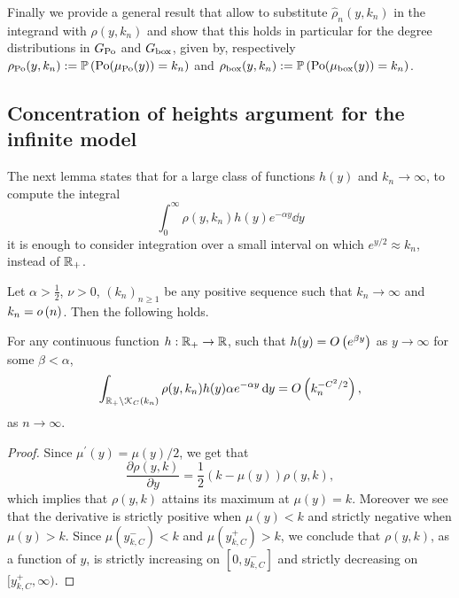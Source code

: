 \begin{appendices}
Finally we provide a general result that allow to substitute $\hat{\rho}_n(y,k_n)$ in the integrand with $\rho(y,k_n)$ and show that this holds in particular for the degree distributions in $G_{{\mathrm{Po}}}$ and $G_{\mathrm{box}}$, given by, respectively $\rho_{{\mathrm{Po}}}(y,k_n) := \mathbb{P}\left({\mathrm{Po}}(\mu_{{\mathrm{Po}}}(y)) = k_n\right)$ and $\rho_{\text{box}}(y,k_n) := \mathbb{P}\left({\mathrm{Po}}(\mu_{\mathrm{box}}(y)) = k_n\right)$.

\subsection{Concentration of heights argument for the infinite model}

The next lemma states that for a large class of functions $h(y)$ and $k_n \to \infty$, to compute the integral 
\[
	\int_{0}^\infty \rho(y,k_n) h(y) e^{-\alpha y} \dd y
\]
it is enough to consider integration over a small interval on which $e^{y/2} \approx k_n$, instead of ${\mathbb R}_+$. 

\begin{lemma}\label{lem:concentration_argument}
Let $\alpha > \frac{1}{2}$, $\nu > 0$, $(k_n)_{n \ge 1}$ be any positive sequence such that $k_n \to \infty$ and $k_n = o\left(n\right)$. Then the following holds.

For any continuous function $h : {\mathbb R}_+ \rightarrow  {\ensuremath{\mathbb R}}$, such that $h(y) = O\left(e^{\beta y}\right)$ as $y \to \infty$ for some $\beta < \alpha$, 
\begin{equation}\label{eq:error_bound_int_rho_not_K}
	\int_{{\mathbb R}_+ \setminus {\mathcal K}_C(k_n)} \rho(y,k_n) h(y) \alpha e^{-\alpha y} \operatorname{\mathrm{d}\hspace{-2pt}} y
	= O\left(k_n^{-C^2/2}\right),
\end{equation}
as $n \to \infty$.
\end{lemma}

\begin{proof}
Since $\mu^\prime(y) = \mu(y)/2$, we get that
\[
	\frac{\partial \rho(y,k)}{\partial y} = \frac{1}{2}\left(k - \mu(y)\right)\rho(y,k),
\]
which implies that $\rho(y,k)$ attains its maximum at $\mu(y) = k$. Moreover we see that the derivative is strictly positive when $\mu(y) < k$ and strictly negative when $\mu(y) > k$. Since $\mu(y_{k,C}^-) < k$ and $\mu(y_{k,C}^+) > k$, we conclude that $\rho(y,k)$, as a function of $y$, is strictly increasing on $[0,y_{k,C}^-]$ and strictly decreasing on $[y_{k,C}^+,\infty)$.


\end{proof}
\end{appendices}

